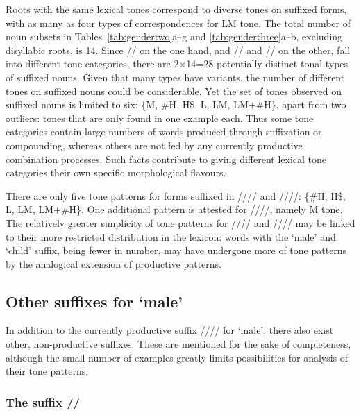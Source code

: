 	Roots with the same lexical tones correspond to diverse tones on suffixed forms, with as many as
	four types of correspondences for LM tone. The total number of noun subsets in Tables~\ref{tab:gendertwo}a--g and \ref{tab:genderthree}a--b, excluding
	disyllabic roots, is 14. Since // on the one hand, and // and // on the
	other, fall into different tone categories, there are 2×14=28 potentially distinct tonal types of
	suffixed nouns. Given that many types have variants, the number of different tones on suffixed nouns
	could be considerable.
	Yet the set of tones observed on suffixed nouns is limited to six: \{M, \#H, H\$, L,
	LM, LM+\#H\}, apart from two outliers: tones that are only found in one example each. Thus some tone categories
	contain large numbers of words produced through suffixation or compounding, whereas others are not
	fed by any currently productive combination processes. Such facts contribute to giving different lexical tone categories
	their own specific morphological flavours.
	
	There are only five tone patterns for forms suffixed in //// and ////: \{\#H, H\$, L, LM, LM+\#H\}. One additional pattern is
	attested for ////, namely M tone. The relatively greater simplicity of tone patterns for
	//// and //// may be linked to their more restricted distribution in the lexicon:
	words with the ‘male’ and ‘child’ suffix, being fewer in number, may have undergone more  of tone patterns by
	the analogical extension of productive patterns.	
	

	\subsection{Other suffixes for ‘male’}
		\label{sec:othermale}

{\largerpage}
	
	In addition to the currently productive suffix //// for ‘male’, there also exist other, non-productive suffixes. These are mentioned for the sake of completeness, although the small number of examples greatly limits possibilities for analysis of their tone patterns.
		
		\subsubsection{The suffix //}
	\label{sec:thesuffixformale}
		

